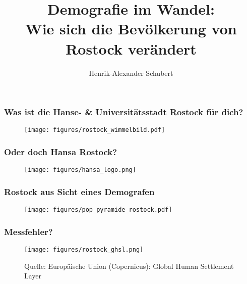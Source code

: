 \documentclass[aspectratio=169]{beamer}
\begin{document}
\title[Theile]									
{Demografie im Wandel: \\
\small Wie sich die Bev\"olkerung von Rostock verändert}
\author[Theile]{Henrik-Alexander Schubert}



\begin{frame}[mpidrbackground=1]
  \titlepage
\end{frame}


\begin{frame}[mpidrbackground = 4]
    \frametitle{Was ist die Hanse- \& Universit\"atsstadt Rostock f\"ur dich?}
    \begin{figure}
   \texttt{[image: figures/rostock\_wimmelbild.pdf]}
\end{figure}
\end{frame}

\begin{frame}[mpidrbackground = 4]
    \frametitle{Oder doch Hansa Rostock?}
    \begin{figure}
   \texttt{[image: figures/hansa\_logo.png]}
\end{figure}
\end{frame}

\begin{frame}[mpidrbackground = 4]
    \frametitle{Rostock aus Sicht eines Demografen}
           \begin{figure}
               \centering
               \vspace{-10pt}
               \texttt{[image: figures/pop\_pyramide\_rostock.pdf]}
           \end{figure}
    \end{frame}

\begin{frame}
    \frametitle{Messfehler?}
    \begin{figure}
    \vspace{-10pt}
   \texttt{[image: figures/rostock\_ghsl.png]}
   \caption{\tiny{Quelle: Europ\"aische Union (Copernicus): Global Human Settlement Layer}}
   \end{figure}
    
\end{frame}
\end{document}
